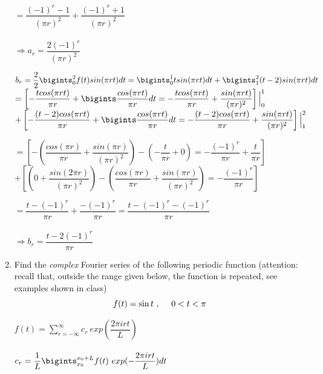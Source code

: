\documentclass[fleqn]{article}
\begin{document}
\begin{enumerate}
      \bigbreak

      \textcolor{hwColor}{
        $=\dfrac{(-1)^r-1}{(\pi r)^2}+\dfrac{(-1)^r+1}{(\pi r)^2}$ \\
        \\
        $\Longrightarrow a_r=\dfrac{2(-1)^r}{(\pi r)^2}$
      }

      \bigbreak

      \textcolor{hwColor}{
        $b_r=\dfrac{2}{2}\bigints_{0}^{2}f(t) sin(\pi rt)dt=\bigints_{0}^{1}t sin(\pi rt)dt+\bigints_{1}^{2}(t-2) sin(\pi rt)dt$ \\
        $=\left[-\dfrac{tcos(\pi rt)}{\pi r}+\bigints\dfrac{cos(\pi rt)}{\pi r}dt=-\dfrac{t cos(\pi rt)}{\pi r}+\dfrac{sin(\pi rt)}{(\pi r)^2}\right]\Big|_{0}^{1}$ \\
        $+\left[-\dfrac{(t-2)cos(\pi rt)}{\pi r}+\bigints\dfrac{cos(\pi rt)}{\pi r}dt=-\dfrac{(t-2)cos(\pi rt)}{\pi r}+\dfrac{sin(\pi rt)}{(\pi r)^2}\right]\Big|_{1}^{2}$
      }

      \bigbreak

      \textcolor{hwColor}{
        $=\left[-(\dfrac{cos(\pi r)}{\pi r}+\dfrac{sin(\pi r)}{(\pi r)^2})-(-\dfrac{t}{\pi r}+0)=-\dfrac{(-1)^r}{\pi r}+\dfrac{t}{\pi r}\right]$ \\
        $+\left[(0+\dfrac{sin(2\pi r)}{(\pi r)^2})-(\dfrac{cos(\pi r)}{\pi r}+\dfrac{sin(\pi r)}{(\pi r)^2})=-\dfrac{(-1)^r}{\pi r}\right]$
      }

      \bigbreak

      \textcolor{hwColor}{
        $=\dfrac{t-(-1)^r}{\pi r}+\dfrac{-(-1)^r}{\pi r}=\dfrac{t-(-1)^r-(-1)^r}{\pi r}$ \\
        \\
        $\Longrightarrow b_r=\dfrac{t-2(-1)^r}{\pi r}$
      }


    \item Find the \emph{complex} Fourier series of the following periodic function (attention: recall that, outside the range given below, the function is repeated, see examples shown in class)
      \begin{equation}
      f(t)=\sin t~, ~~~~0< t < \pi \\
      \end{equation}

      \textcolor{hwColor}{
        $f(t)=\sum\limits_{r=-\infty}^{\infty} c_r~exp(\dfrac{2\pi irt}{L})$ \\
        \\
        $c_r=\dfrac{1}{L} \bigints_{x_0}^{x_0+L}f(t) ~ exp(-\dfrac{2\pi irt}{L}) dt$
      }


\end{enumerate}
\end{document}
